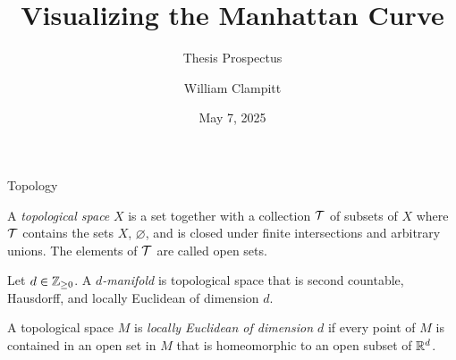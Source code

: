 \documentclass{beamer}
\title{Visualizing the Manhattan Curve}
\subtitle{Thesis Prospectus}
\author{William Clampitt}
\date{May 7, 2025}
\begin{document}
	\begin{frame}
		\titlepage
	\end{frame}
	
	\begin{frame}{Topology}
		
		\begin{definition}
			A \emph{topological space} $X$ is a set together with a collection $\mathcal{T}$ of subsets of $X$ where $\mathcal{T}$ contains the sets $X$, $\varnothing$, and is closed under finite intersections and arbitrary unions. The elements of $\mathcal{T}$ are called open sets.
		\end{definition}
		\medskip
		\pause
		\begin{definition}[$d$-manifold]
			Let $d\in \mathbb{Z}_{\geq 0}$. A \emph{$d$-manifold} is topological space that is second countable, Hausdorff, and locally Euclidean of dimension $d$.
		\end{definition}
		\medskip
		\pause 
		\begin{definition}
			A topological space $M$ is \emph{locally Euclidean of dimension $d$} if every point of $M$ is contained in an open set in $M$ that is homeomorphic to an open subset of $\mathbb{R}^d$.
		\end{definition}
	\end{frame}
	
	
\end{document}
